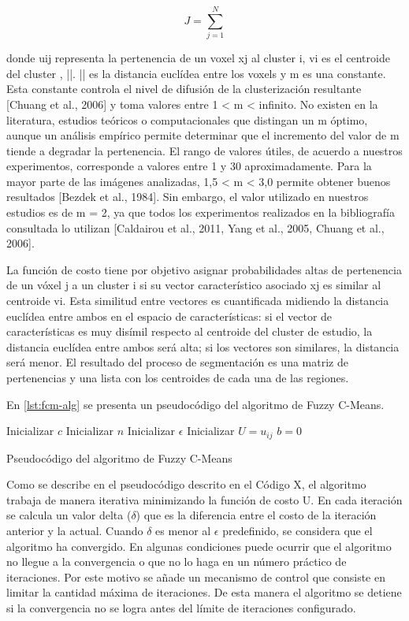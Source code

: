\[\label{eq:solve} J= \sum^{N}_{j=1} \]

donde uij representa la pertenencia de un voxel xj al cluster i, vi es el centroide del cluster , ||. || es la distancia euclídea entre los voxels y m es una constante. Esta constante controla el nivel de difusión de la clusterización resultante [Chuang et al., 2006] y toma valores entre 1 < m < infinito. No existen en la literatura, estudios teóricos o computacionales que distingan un m óptimo, aunque un análisis empírico permite determinar que el incremento del valor de m tiende a degradar la pertenencia. El rango de valores útiles, de acuerdo a nuestros experimentos, corresponde a valores entre 1 y 30 aproximadamente. Para la mayor parte de las imágenes analizadas, 1,5 < m < 3,0 permite obtener buenos resultados [Bezdek et al., 1984]. Sin embargo, el valor utilizado en nuestros estudios es de m = 2, ya que todos los experimentos realizados en la bibliografía consultada lo utilizan [Caldairou et al., 2011, Yang et al., 2005, Chuang et al., 2006]. 

La función de costo tiene por objetivo asignar probabilidades altas de pertenencia de un vóxel j a un cluster i si su vector característico asociado xj es similar al centroide vi. Esta similitud entre vectores es cuantificada midiendo la distancia euclídea entre ambos en el espacio de características: si el vector de características es muy disímil respecto al centroide del cluster de estudio, la distancia euclídea entre ambos será alta; si los vectores son similares, la distancia será menor. El resultado del proceso de segmentación es una matriz de pertenencias y una lista con los centroides de cada una de las regiones.

En \ref{lst:fcm-alg} se presenta un pseudocódigo del algoritmo de Fuzzy C-Means.


\begin{algorithm}[H]
Inicializar $c$ 
Inicializar $n$ 
Inicializar $\epsilon$\;
Inicializar $U = u_{ij}$ 
$b = 0$\;
\caption{Pseudocódigo del algoritmo de Fuzzy C-Means}
\label{lst:fcm-alg}
\end{algorithm}



Como se describe en el pseudocódigo descrito en el Código X, el algoritmo trabaja de manera iterativa minimizando la función de costo U. En cada iteración se calcula un valor delta ($\delta$) que es la diferencia entre el costo de la iteración anterior y la actual. Cuando $\delta$  es menor al $\epsilon$ predefinido, se considera que el algoritmo ha convergido. En algunas condiciones puede ocurrir que el algoritmo no llegue a la convergencia o que no lo haga en un número práctico de iteraciones. Por este motivo se añade un mecanismo de control que consiste en limitar la cantidad máxima de iteraciones. De esta manera el algoritmo se detiene si la convergencia no se logra antes del límite de iteraciones configurado.

